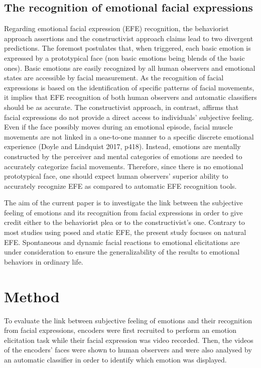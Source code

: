\documentclass[conference,final,]{IEEEtran}
\begin{document}
\hypertarget{the-recognition-of-emotional-facial-expressions}{%
\subsection{The recognition of emotional facial
expressions}\label{the-recognition-of-emotional-facial-expressions}}

Regarding emotional facial expression (EFE) recognition, the behaviorist
approach assertions and the constructivist approach claims lead to two
divergent predictions. The foremost postulates that, when triggered,
each basic emotion is expressed by a prototypical face (non basic
emotions being blends of the basic ones). Basic emotions are easily
recognized by all human observers and emotional states are accessible by
facial measurement. As the recognition of facial expressions is based on
the identification of specific patterns of facial movements, it implies
that EFE recognition of both human observers and automatic classifiers
should be as accurate. The constructivist approach, in contrast, affirms
that facial expressions do not provide a direct access to individuals'
subjective feeling. Even if the face possibly moves during an emotional
episode, facial muscle movements are not linked in a one-to-one manner
to a specific discrete emotional experience (Doyle and Lindquist 2017,
p418). Instead, emotions are mentally constructed by the perceiver and
mental categories of emotions are needed to accurately categorize facial
movements. Therefore, since there is no emotional prototypical face, one
should expect human observers' superior ability to accurately recognize
EFE as compared to automatic EFE recognition tools.

The aim of the current paper is to investigate the link between the
subjective feeling of emotions and its recognition from facial
expressions in order to give credit either to the behaviorist plea or to
the constructivist's one. Contrary to most studies using posed and
static EFE, the present study focuses on natural EFE. Spontaneous and
dynamic facial reactions to emotional elicitations are under
consideration to ensure the generalizability of the results to emotional
behaviors in ordinary life.

\hypertarget{method}{%
\section{Method}\label{method}}

To evaluate the link between subjective feeling of emotions and their
recognition from facial expressions, encoders were first recruited to
perform an emotion elicitation task while their facial expression was
video recorded. Then, the videos of the encoders' faces were shown to
human observers and were also analysed by an automatic classifier in
order to identify which emotion was displayed.
\end{document}
